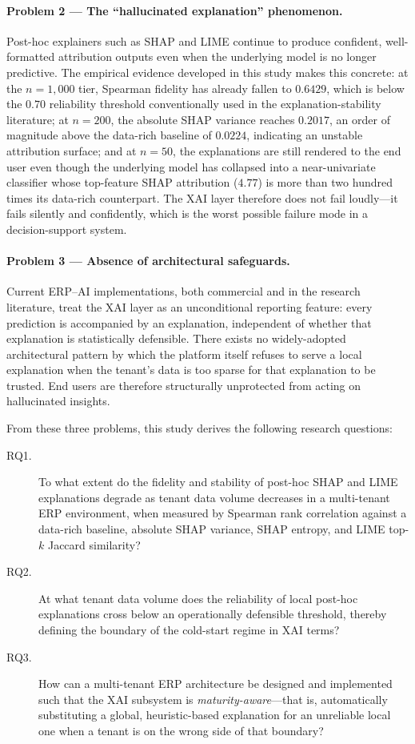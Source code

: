 \paragraph{Problem 2 --- The ``hallucinated explanation'' phenomenon.}
Post-hoc explainers such as SHAP and LIME continue to produce confident, well-formatted attribution outputs even when the underlying model is no longer predictive. The empirical evidence developed in this study makes this concrete: at the $n = 1{,}000$ tier, Spearman fidelity has already fallen to $0.6429$, which is below the $0.70$ reliability threshold conventionally used in the explanation-stability literature; at $n = 200$, the absolute SHAP variance reaches $0.2017$, an order of magnitude above the data-rich baseline of $0.0224$, indicating an unstable attribution surface; and at $n = 50$, the explanations are still rendered to the end user even though the underlying model has collapsed into a near-univariate classifier whose top-feature SHAP attribution ($4.77$) is more than two hundred times its data-rich counterpart. The XAI layer therefore does not fail loudly---it fails silently and confidently, which is the worst possible failure mode in a decision-support system.

\paragraph{Problem 3 --- Absence of architectural safeguards.}
Current ERP--AI implementations, both commercial and in the research literature, treat the XAI layer as an unconditional reporting feature: every prediction is accompanied by an explanation, independent of whether that explanation is statistically defensible. There exists no widely-adopted architectural pattern by which the platform itself refuses to serve a local explanation when the tenant's data is too sparse for that explanation to be trusted. End users are therefore structurally unprotected from acting on hallucinated insights.

From these three problems, this study derives the following research questions:

\begin{description}
    \item[RQ1.] To what extent do the fidelity and stability of post-hoc SHAP and LIME explanations degrade as tenant data volume decreases in a multi-tenant ERP environment, when measured by Spearman rank correlation against a data-rich baseline, absolute SHAP variance, SHAP entropy, and LIME top-$k$ Jaccard similarity?
    \item[RQ2.] At what tenant data volume does the reliability of local post-hoc explanations cross below an operationally defensible threshold, thereby defining the boundary of the cold-start regime in XAI terms?
    \item[RQ3.] How can a multi-tenant ERP architecture be designed and implemented such that the XAI subsystem is \emph{maturity-aware}---that is, automatically substituting a global, heuristic-based explanation for an unreliable local one when a tenant is on the wrong side of that boundary?
\end{description}

